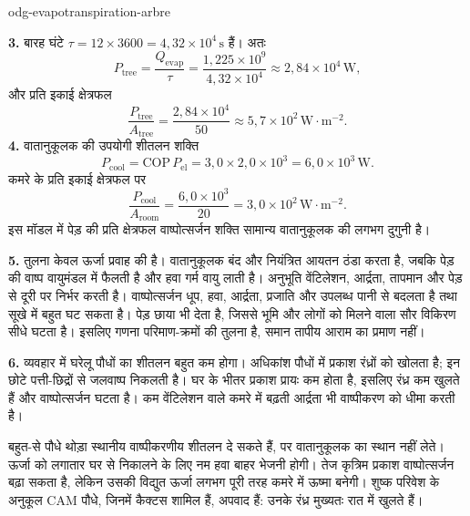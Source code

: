 \begin{exo}[एक बड़े पेड़ का वाष्पोत्सर्जन: प्राकृतिक वातानुकूलक?]{odg-evapotranspiration-arbre}
\begin{solution}
\textbf{3.} बारह घंटे $\tau=12\times3600=4{,}32\times10^4\,\text{s}$ हैं। अतः
\[
P_{\text{tree}}=\frac{Q_{\mathrm{evap}}}{\tau}
=\frac{1{,}225\times10^9}{4{,}32\times10^4}\approx2{,}84\times10^4\,\text{W},
\]
और प्रति इकाई क्षेत्रफल
\[
\frac{P_{\text{tree}}}{A_{\text{tree}}}
=\frac{2{,}84\times10^4}{50}\approx5{,}7\times10^2\,\text{W}\!\cdot\!\text{m}^{-2}.
\]
\textbf{4.} वातानुकूलक की उपयोगी शीतलन शक्ति
\[
P_{\text{cool}}=\mathrm{COP}\,P_{\mathrm{el}}
=3{,}0\times2{,}0\times10^3=6{,}0\times10^3\,\text{W}.
\]
कमरे के प्रति इकाई क्षेत्रफल पर
\[
\frac{P_{\text{cool}}}{A_{\text{room}}}
=\frac{6{,}0\times10^3}{20}=3{,}0\times10^2\,\text{W}\!\cdot\!\text{m}^{-2}.
\]
इस मॉडल में पेड़ की प्रति क्षेत्रफल वाष्पोत्सर्जन शक्ति सामान्य वातानुकूलक की लगभग दुगुनी है।

\textbf{5.} तुलना केवल ऊर्जा प्रवाह की है। वातानुकूलक बंद और नियंत्रित आयतन ठंडा करता है, जबकि पेड़ की वाष्प वायुमंडल में फैलती है और हवा गर्म वायु लाती है। अनुभूति वेंटिलेशन, आर्द्रता, तापमान और पेड़ से दूरी पर निर्भर करती है। वाष्पोत्सर्जन धूप, हवा, आर्द्रता, प्रजाति और उपलब्ध पानी से बदलता है तथा सूखे में बहुत घट सकता है। पेड़ छाया भी देता है, जिससे भूमि और लोगों को मिलने वाला सौर विकिरण सीधे घटता है। इसलिए गणना परिमाण-क्रमों की तुलना है, समान तापीय आराम का प्रमाण नहीं।

\textbf{6.} व्यवहार में घरेलू पौधों का शीतलन बहुत कम होगा। अधिकांश पौधों में प्रकाश रंध्रों को खोलता है; इन छोटे पत्ती-छिद्रों से जलवाष्प निकलती है। घर के भीतर प्रकाश प्रायः कम होता है, इसलिए रंध्र कम खुलते हैं और वाष्पोत्सर्जन घटता है। कम वेंटिलेशन वाले कमरे में बढ़ती आर्द्रता भी वाष्पीकरण को धीमा करती है।

बहुत-से पौधे थोड़ा स्थानीय वाष्पीकरणीय शीतलन दे सकते हैं, पर वातानुकूलक का स्थान नहीं लेते। ऊर्जा को लगातार घर से निकालने के लिए नम हवा बाहर भेजनी होगी। तेज कृत्रिम प्रकाश वाष्पोत्सर्जन बढ़ा सकता है, लेकिन उसकी विद्युत ऊर्जा लगभग पूरी तरह कमरे में ऊष्मा बनेगी। शुष्क परिवेश के अनुकूल CAM पौधे, जिनमें कैक्टस शामिल हैं, अपवाद हैं: उनके रंध्र मुख्यतः रात में खुलते हैं।
\end{solution}
\end{exo}

